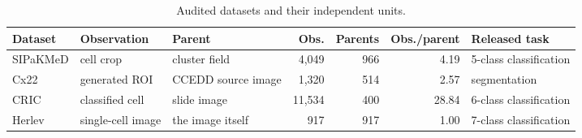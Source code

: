\begin{table}[t]
\centering\footnotesize
\setlength{\tabcolsep}{4pt}
\caption{Audited datasets and their independent units.}
\label{tab:datasets}
\begin{tabular}{lllrrrl}
\toprule
Dataset & Observation & Parent & Obs. & Parents & Obs./parent & Released task \\
\midrule
SIPaKMeD & cell crop & cluster field & 4,049 & 966 & 4.19 & 5-class classification \\
Cx22 & generated ROI & CCEDD source image & 1,320 & 514 & 2.57 & segmentation \\
CRIC & classified cell & slide image & 11,534 & 400 & 28.84 & 6-class classification \\
Herlev & single-cell image & the image itself & 917 & 917 & 1.00 & 7-class classification \\
\bottomrule
\end{tabular}
\end{table}
